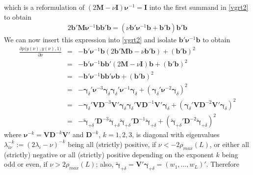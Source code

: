 \documentclass[a4paper]{article}
\begin{document}
which is a reformulation of $(2{\mathbf{M}}-\nu\mathbf{I}){\boldsymbol{\nu}}^{-1}=\mathbf{I}$  into the first summand  in \ref{vgrt2} to obtain
\begin{eqnarray*}
2\mathbf{b}'{\mathbf{M}}{\boldsymbol{\nu}}^{-1}\mathbf{b}\mathbf{b'}\mathbf{b}=\left(\nu\mathbf{b}'{\boldsymbol{\nu}}^{-1}\mathbf{b}+\mathbf{b'}\mathbf{b}\right)\mathbf{b'}\mathbf{b}
\end{eqnarray*}
We can now insert this expression into \ref{vgrt2} and isolate $\mathbf{b}'{\boldsymbol{\nu}}^{-1}\mathbf{b}$ to obtain
\begin{eqnarray}
\frac{\partial\rho\Big(y(\nu),y(\nu),1\Big)}{\partial\nu}&=&-\mathbf{b}'{\boldsymbol{\nu}}^{-1}\mathbf{b}\left(2\mathbf{b}'\mathbf{{M}b}-\nu\mathbf{b}'\mathbf{b}\right)+(\mathbf{b}'\mathbf{b})^2\nonumber\\
&=&-\mathbf{b}'{\boldsymbol{\nu}}^{-1}\mathbf{b}\mathbf{b}'\left(2{\mathbf{M}}-\nu{\mathbf{I}}\right)\mathbf{b}+(\mathbf{b}'\mathbf{b})^2\nonumber\\
&=&-\mathbf{b}'{\boldsymbol{\nu}}^{-1}\mathbf{b}\mathbf{b}'{\boldsymbol{\nu}}\mathbf{b}+(\mathbf{b}'\mathbf{b})^2\nonumber\\
&=&-\boldsymbol{\gamma}_{\delta}'{\boldsymbol{\nu}}^{-3}\boldsymbol{\gamma}_{\delta}\boldsymbol{\gamma}_{\delta}'{\boldsymbol{\nu}}^{-1}\boldsymbol{\gamma}_{\delta}+(\boldsymbol{\gamma}_{\delta}'{\boldsymbol{\nu}}^{-2}\boldsymbol{\gamma}_{\delta})^2\label{negcorlag1}\\
&=&-\boldsymbol{\gamma}_{\delta}'\mathbf{V}\mathbf{D}^{-3}\mathbf{V}'\boldsymbol{\gamma}_{\delta}\boldsymbol{\gamma}_{\delta}'\mathbf{V}\mathbf{D}^{-1}\mathbf{V}'\boldsymbol{\gamma}_{\delta}+(\boldsymbol{\gamma}_{\delta}'\mathbf{V}\mathbf{D}^{-2}\mathbf{V}'\boldsymbol{\gamma}_{\delta})^2\nonumber\\
&=&-\boldsymbol{\tilde{\gamma}}_{+\delta}'\mathbf{D}^{-3}\boldsymbol{\tilde{\gamma}}_{+\delta}\boldsymbol{\tilde{\gamma}}_{+\delta}'\mathbf{D}^{-1}\boldsymbol{\tilde{\gamma}}_{+\delta}+(\boldsymbol{\tilde{\gamma}}_{+\delta}'\mathbf{D}^{-2}\boldsymbol{\tilde{\gamma}}_{+\delta})^2\nonumber
\end{eqnarray}
where ${\boldsymbol{\nu}}^{-k}=\mathbf{V}\mathbf{D}^{-k}\mathbf{V}'$ and $\mathbf{D}^{-k}$, $k=1,2,3$, is diagonal with eigenvalues $\lambda_{i\nu}^{-k}:=(2\lambda_i-\nu)^{-k}$ being all (strictly) positive, 
if $\nu<-2\rho_{max}(L)$, or either all (strictly) negative or all (strictly) positive depending on the exponent $k$ being odd or even, if $\nu>2\rho_{max}(L)$; also,  $\boldsymbol{\tilde{\gamma}}_{+\delta}=\mathbf{V}'\boldsymbol{{\gamma}}_{+\delta}=(w_1,...,w_L)'$. Therefore
\end{document}

